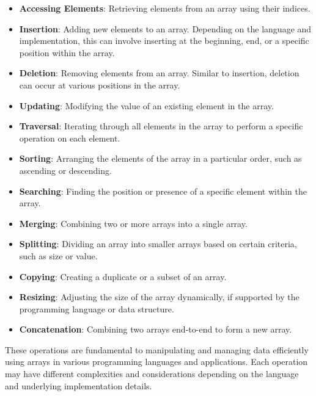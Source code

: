 \documentclass{article}
\begin{document}
\begin{itemize}
    \item \textbf{Accessing Elements}: Retrieving elements from an array using their indices.
    
    \item \textbf{Insertion}: Adding new elements to an array. Depending on the language and implementation, this can involve inserting at the beginning, end, or a specific position within the array.
    
    \item \textbf{Deletion}: Removing elements from an array. Similar to insertion, deletion can occur at various positions in the array.
    
    \item \textbf{Updating}: Modifying the value of an existing element in the array.
    
    \item \textbf{Traversal}: Iterating through all elements in the array to perform a specific operation on each element.
    
    \item \textbf{Sorting}: Arranging the elements of the array in a particular order, such as ascending or descending.
    
    \item \textbf{Searching}: Finding the position or presence of a specific element within the array.
    
    \item \textbf{Merging}: Combining two or more arrays into a single array.
    
    \item \textbf{Splitting}: Dividing an array into smaller arrays based on certain criteria, such as size or value.
    
    \item \textbf{Copying}: Creating a duplicate or a subset of an array.
    
    \item \textbf{Resizing}: Adjusting the size of the array dynamically, if supported by the programming language or data structure.
    
    \item \textbf{Concatenation}: Combining two arrays end-to-end to form a new array.
\end{itemize}

These operations are fundamental to manipulating and managing data efficiently using arrays in various programming languages and applications. Each operation may have different complexities and considerations depending on the language and underlying implementation details.
\end{document}
